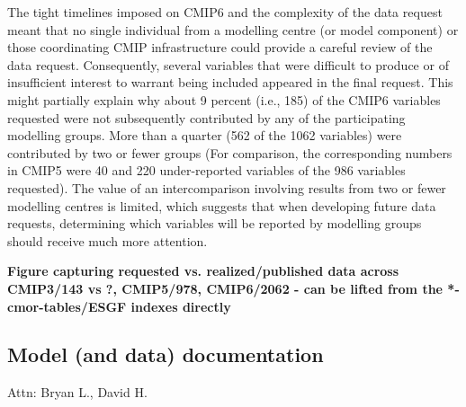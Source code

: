 \documentclass[gmd, preprint]{copernicus}
\newcommand{\mycomment}[1]{}
\def\cred#1{{\color{red}#1}}
\begin{document}
The tight timelines imposed on CMIP6 and the complexity of the data request meant that no single individual from a modelling centre (or model component) or those coordinating CMIP infrastructure could provide a careful review of the data request. Consequently, several variables that were difficult to produce or of insufficient interest to warrant being included appeared in the final request. This might partially explain why about 9 percent (i.e., 185) of the CMIP6 variables requested were not subsequently contributed by any of the participating modelling groups. More than a quarter (562 of the 1062 variables) were contributed by two or fewer groups (For comparison, the corresponding numbers in CMIP5 were 40 and 220 under-reported variables of the 986 variables requested). The value of an intercomparison involving results from two or fewer modelling centres is limited, which suggests that when developing future data requests, determining which variables will be reported by modelling groups should receive much more attention. 

\cred{\textbf{Figure capturing requested vs. realized/published data across CMIP3/143 vs ?, CMIP5/978, CMIP6/2062 - can be lifted from the *-cmor-tables/ESGF indexes directly}}

\mycomment{
The CMIP6 "data request" \citep{juckes_cmip6_2020} was the most comprehensively outlined preceded by three decades of evolution in climate model understanding. This history underpinned the development of the standard experimental protocols 
\citet{gates_amip_1991} - AMIP1
\citet{gates_amip_1993} - AMIP History Archive
\citet{gates_amip_1994} - AMIP Ensemble
\citet{gleckler_amip_1996} - AMIP 7 monthly mean and six-hourly output, plus ensembles/AMIP 2
\citet{gleckler_amip_1996-1} - AMIP number 8, STANDARD OUTPUT low and high frequency (6-hr)
https://pcmdi.llnl.gov/mips/amip/OUTPUT/WGNEDIAGS/index.html
\citet{taylor_pcmdi_2009}
\citet{taylor_pcmdi_2013}
\citet{juckes_baseline_2024}

FANGIO not multi-year (perpetual July)/January; AMIP1 success, multi-year SST/sea-ice (Russians and Chinese); AMIP2 next-level output, more high-frequency data, mean products (covariances; u/v-prime overbar - on the fly calculation) monthly mean timeseries (Boer \& Lambert 2008, clim dyn - relationship to Lorenz energy cycle)
CMIP2: https://pcmdi.llnl.gov/mips/cmip2/
CMIP3: https://pcmdi.llnl.gov/mips/cmip3/experiment.html
CMIP5: https://pcmdi.llnl.gov/mips/cmip5/requirements.html
}


\subsection{Model (and data) documentation}
\label{sec:ModelDocumentation}
\cred{Attn: Bryan L., David H.}
\end{document}
